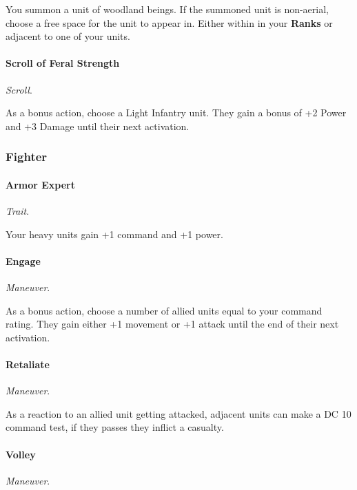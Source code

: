 \documentclass[letterpaper,twocolumn,openany,nodeprecatedcode]{dndbook}
\begin{document}
You summon a unit of woodland beings.
If the summoned unit is non-aerial,
choose a free space for the unit to appear in.
Either within in your \textbf{Ranks}
or adjacent to one of your units.

\paragraph{Scroll of Feral Strength}
\textit{Scroll}.

As a bonus action, choose a Light Infantry unit.
They gain a bonus of +2 Power and +3 Damage until their next activation.


\subsubsection{Fighter}



\paragraph{Armor Expert}
\textit{Trait}.

Your heavy units gain +1 command and +1 power.

\paragraph{Engage}
\textit{Maneuver}.

As a bonus action, choose a number of allied units equal to your command rating.
They gain either +1 movement or +1 attack until the end of their next activation.

\paragraph{Retaliate}
\textit{Maneuver}.

As a reaction to an allied unit getting attacked,
adjacent units can make a DC 10 command test,
if they passes they inflict a casualty.

\paragraph{Volley}
\textit{Maneuver}.
\end{document}
